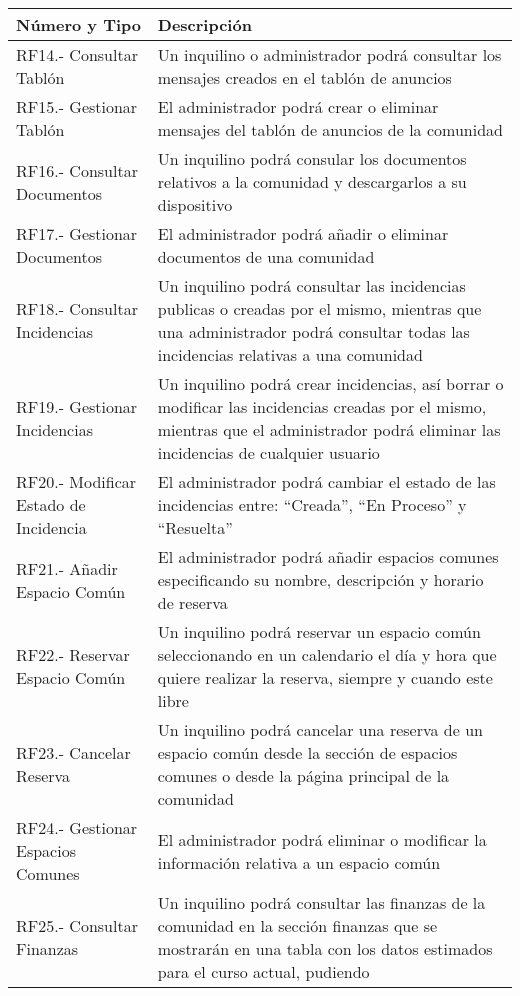 \begin{appendices}
\begin{table}[H]
	\begin{center}
		\bgroup
		\def\arraystretch{1.5}
		\begin{tabular}{| p{5cm} | p{10cm} |}
			\hline
			\textbf{Número y Tipo} & \textbf{Descripción}  \\ \hline
			RF14.- Consultar Tablón & Un inquilino o administrador podrá consultar los mensajes creados en
			el tablón de anuncios \\ \hline
			RF15.- Gestionar Tablón & El administrador podrá crear o eliminar mensajes del tablón de anuncios de la comunidad \\ \hline
			RF16.- Consultar Documentos &  Un inquilino podrá consular los documentos relativos a la comunidad y descargarlos a su dispositivo\\ \hline
			RF17.- Gestionar Documentos & El administrador podrá añadir o eliminar documentos de una comunidad \\ \hline
			RF18.- Consultar Incidencias &  Un inquilino podrá consultar las incidencias publicas o creadas por
			el mismo, mientras que una administrador podrá consultar todas las incidencias relativas a una
			comunidad \\ \hline
			RF19.- Gestionar Incidencias & Un inquilino podrá crear incidencias, así borrar o modificar las incidencias creadas por
			el mismo, mientras que el administrador podrá eliminar las incidencias de cualquier usuario \\ \hline
			RF20.- Modificar Estado de Incidencia &  El administrador podrá cambiar el estado de las incidencias entre: “Creada”, “En Proceso” y “Resuelta”\\ \hline
			RF21.- Añadir Espacio Común & El administrador podrá añadir espacios comunes especificando
			su nombre, descripción y horario de reserva \\ \hline
			RF22.- Reservar Espacio Común & Un inquilino podrá reservar un espacio común seleccionando
			en un calendario el día y hora que quiere realizar la reserva, siempre y cuando este libre \\ \hline
			RF23.- Cancelar Reserva & Un inquilino podrá cancelar una reserva de un espacio común desde la
			sección de espacios comunes o desde la página principal de la comunidad  \\ \hline
			RF24.- Gestionar Espacios Comunes &  El administrador podrá eliminar o modificar la información relativa a un espacio común \\ \hline
			RF25.- Consultar Finanzas & Un inquilino podrá consultar las finanzas de la comunidad en la sección finanzas que se mostrarán en una tabla con los datos estimados para el curso actual, pudiendo

\end{tabular}
\end{center}
\end{table}
\end{appendices}
